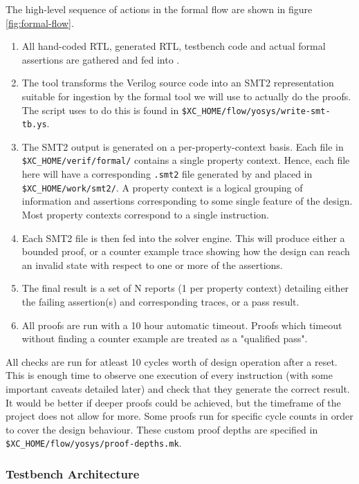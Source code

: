 The high-level sequence of actions in the formal flow are shown in figure
\ref{fig:formal-flow}.

\begin{enumerate}
\item All hand-coded RTL, generated RTL, testbench code and actual
    formal assertions are gathered and fed into \yosys.
\item The \yosys tool transforms the Verilog source code into an SMT2
    representation suitable for ingestion by the formal tool we will use
    to actually do the proofs.
    The script \yosys uses to do this is found in
    {\tt \$XC\_HOME/flow/yosys/write-smt-tb.ys}.
\item The SMT2 output is generated on a per-property-context basis.
    Each file in
    {\tt \$XC\_HOME/verif/formal/}
    contains a single property context.
    Hence, each file here will have a corresponding {\tt .smt2}
    file generated by \yosys and placed in
    {\tt \$XC\_HOME/work/smt2/}.
    A property context is a logical grouping of information and assertions
    corresponding to some single feature of the design.
    Most property contexts correspond to a single instruction.
\item Each SMT2 file is then fed into the solver engine.
    This will produce either a bounded proof, or a counter example trace
    showing how the design can reach an invalid state with respect to
    one or more of the assertions.
\item The final result is a set of N reports (1 per property context)
    detailing either the failing assertion(s) and corresponding traces,
    or a pass result.
\item All proofs are run with a 10 hour automatic timeout.
    Proofs which timeout without finding a counter example are treated
    as a "qualified pass".
\end{enumerate}

All checks are run for atleast 10 cycles worth of design operation after
a reset.
This is enough time to observe one execution of every instruction (with
some important caveats detailed later) and check that they generate the
correct result.
It would be better if deeper proofs could be achieved, but the timeframe of
the project does not allow for more.
Some proofs run for specific cycle counts in order to cover the design
behaviour.
These custom proof depths are specified in 
{\tt \$XC\_HOME/flow/yosys/proof-depths.mk}.

\subsubsection{Testbench Architecture}

